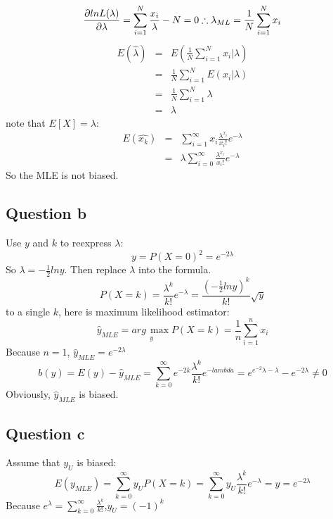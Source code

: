 \documentclass[12pt,letterpaper]{article}
\begin{document}
\begin{equation}\label{3aeq4}
\frac{\partial lnL(\lambda)}{\partial\lambda}=\sum^N_{i=1}\frac{x_i}\lambda-N=0\\
\therefore \lambda_{ML}=\frac1N\sum^N_{i=1}x_i
\end{equation}
\begin{eqnarray}\label{3aeq5}
  E(\hat{\lambda})
  &=&E(\frac1N\sum^N_{i=1}x_i|\lambda)\\
  &=&\frac1N\sum^N_{i=1}E(x_i|\lambda)\nonumber\\
  &=&\frac1N\sum^N_{i=1}\lambda\nonumber\\\
  &=&\lambda\nonumber
\end{eqnarray}
note that $E[X]=\lambda$:
\begin{eqnarray}
  E(\hat{x_k})
  &=&  \sum^\infty_{i=1}x_i\frac{\lambda^{x_i}}{x_i!}e^{-\lambda} \nonumber\\
  &=& \lambda\sum^\infty_{i=0}\frac{\lambda^{x_i}}{x_i!}e^{-\lambda}\nonumber
\end{eqnarray}
So the MLE is not biased.


\subsection*{Question b}
Use $y$ and $k$ to reexpress $\lambda$:
\begin{equation}
  y=P(X=0)^2=e^{-2\lambda}
\end{equation}
So $\lambda=-\frac12lny$. Then replace $\lambda$ into the formula.
\begin{equation}
  P(X=k)=\frac{\lambda^k}{k!}e^{-\lambda}=\frac{(-\frac12lny)^k}{k!}\sqrt{y}
\end{equation}
to a single $k$, here is maximum likelihood estimator:
\begin{equation}
  \hat{y}_{MLE}=\underset{y}{arg\,\max}P(X=k)=\frac1n\sum^n_{i=1}x_i
\end{equation}
Because $n=1$, $\hat{y}_{MLE}=e^{-2\lambda}$
\begin{equation}
  b(y)=E(y)-\hat{y}_{MLE}=\sum^\infty_{k=0}e^{-2k}\frac{\lambda^k}{k!}e^{-lambda}=e^{e^{-2}\lambda-\lambda}-e^{-2\lambda}\neq{0}
\end{equation}
Obviously, $\hat y_{MLE}$ is biased.
\subsection*{Question c}
Assume that $y_U$ is biased:
\begin{equation}
  E(y_{MLE})=\sum^\infty_{k=0}y_UP(X=k)=\sum^\infty_{k=0}y_U\frac{\lambda^k}{k!}e^{-\lambda}=y=e^{-2\lambda}
\end{equation}
Because $e^\lambda=\sum^\infty_{k=0}\frac{\lambda^k}{k!}$,$y_U=(-1)^k$
\end{document}
